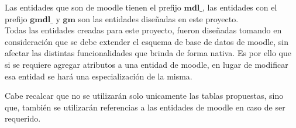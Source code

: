 


    Las entidades que son de moodle tienen el prefijo \(\textbf{mdl\_}\), las entidades con el prefijo
 \(\textbf{gmdl\_}\) y \(\textbf{gm}\) son las entidades diseñadas en este proyecto.\\

 \noindent Todas las entidades creadas para este proyecto, fueron diseñadas tomando en
 consideración que se debe extender el esquema de base de datos de moodle, sin afectar las distintas
 funcionalidades que brinda de forma nativa. Es por ello que si se requiere agregar atributos a una entidad de moodle, en lugar de modificar esa entidad se hará una especialización de la misma.

 \noindent Cabe recalcar que no se utilizarán solo unicamente las tablas propuestas, sino que, también se utilizarán referencias a las entidades de moodle en caso de ser requerido.


\newcommand{\schemeName}[1]{%
    \vspace{-1em}\hfill Nombre en el esquema: {\it #1}\ \ \par%
}

    

    
    
    
    
    
    






